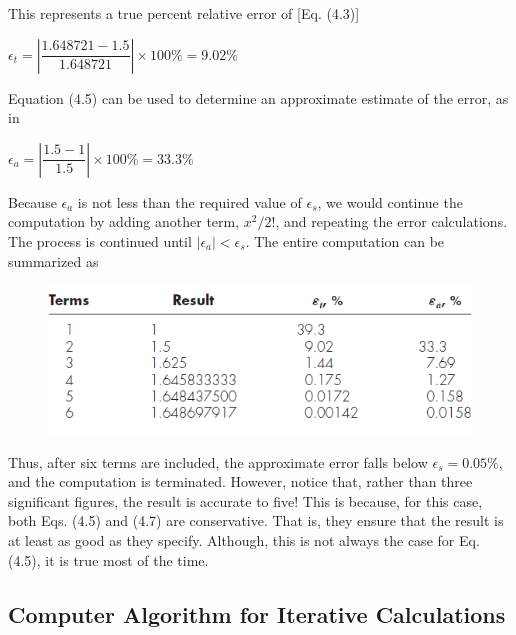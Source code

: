 \documentclass[../main.tex]{subfiles}
\begin{document}
\begin{example}
    \noindent
    This represents a true percent relative error of [Eq. (4.3)]
    \newline

    $\epsilon_t = \left\lvert\dfrac{1.648721-1.5}{1.648721}\right\rvert\times100\%=9.02\%$
    \newline

    \noindent
    Equation (4.5) can be used to determine an approximate estimate of the error, as in
    \newline

    $\epsilon_a = \left\lvert\dfrac{1.5-1}{1.5}\right\rvert\times100\%=33.3\%  $
    \newline

    \noindent
    Because ${\epsilon_a}$ is not less than the required value of $\epsilon_s$, we would continue the computation by
    adding another term, $x^2/2!$, and repeating the error calculations. The process is continued
    until $\left\lvert\epsilon_a \right\rvert < \epsilon_s$. The entire computation can be summarized as
    \newline

    \begin{figure}[h]
        \includegraphics{./images/fig_4_1_1}
    \end{figure}

    \noindent
    Thus, after six terms are included, the approximate error falls below $\epsilon_s=0.05\%$, and the
    computation is terminated. However, notice that, rather than three significant figures, the
    result is accurate to five! This is because, for this case, both Eqs. (4.5) and (4.7) are conservative.
    That is, they ensure that the result is at least as good as they specify. Although,
    this is not always the case for Eq. (4.5), it is true most of the time.
\end{example}
\newpage

\subsection{Computer Algorithm for Iterative Calculations}
\end{document}
